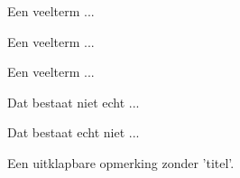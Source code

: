 \documentclass{ximera}
\begin{document}

\begin{definition}[Veelterm]
   Een veelterm ...
\end{definition}

\begin{definition}[Veelterm]
   Een veelterm ...
\end{definition}

\begin{theorem}[Veelterm]
   Een veelterm ...
\end{theorem}




\begin{example}

    Dat bestaat niet echt ...
\end{example}

\begin{remark}

    Dat bestaat echt niet ...
\end{remark}

\begin{remark}[expandable]

    Een uitklapbare opmerking zonder 'titel'.
\end{remark}
\end{document}
